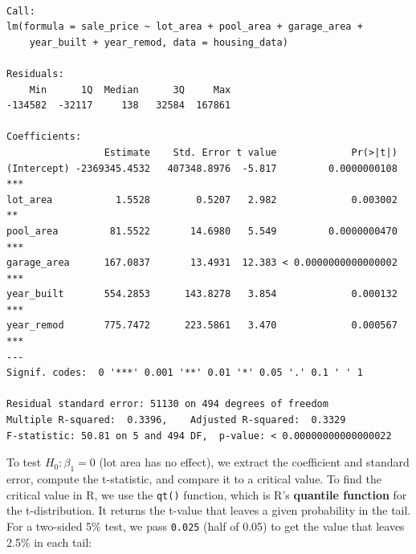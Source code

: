 \documentclass[
  letterpaper,
  DIV=11,
  numbers=noendperiod]{scrreprt}
\begin{document}
\begin{verbatim}

Call:
lm(formula = sale_price ~ lot_area + pool_area + garage_area + 
    year_built + year_remod, data = housing_data)

Residuals:
    Min      1Q  Median      3Q     Max 
-134582  -32117     138   32584  167861 

Coefficients:
                 Estimate    Std. Error t value             Pr(>|t|)    
(Intercept) -2369345.4532   407348.8976  -5.817         0.0000000108 ***
lot_area           1.5528        0.5207   2.982             0.003002 ** 
pool_area         81.5522       14.6980   5.549         0.0000000470 ***
garage_area      167.0837       13.4931  12.383 < 0.0000000000000002 ***
year_built       554.2853      143.8278   3.854             0.000132 ***
year_remod       775.7472      223.5861   3.470             0.000567 ***
---
Signif. codes:  0 '***' 0.001 '**' 0.01 '*' 0.05 '.' 0.1 ' ' 1

Residual standard error: 51130 on 494 degrees of freedom
Multiple R-squared:  0.3396,    Adjusted R-squared:  0.3329 
F-statistic: 50.81 on 5 and 494 DF,  p-value: < 0.00000000000000022
\end{verbatim}

To test \(H_0: \beta_1 = 0\) (lot area has no effect), we extract the
coefficient and standard error, compute the t-statistic, and compare it
to a critical value. To find the critical value in R, we use the
\texttt{qt()} function, which is R's \textbf{quantile function} for the
t-distribution. It returns the t-value that leaves a given probability
in the tail. For a two-sided 5\% test, we pass \texttt{0.025} (half of
0.05) to get the value that leaves 2.5\% in each tail:
\end{document}
